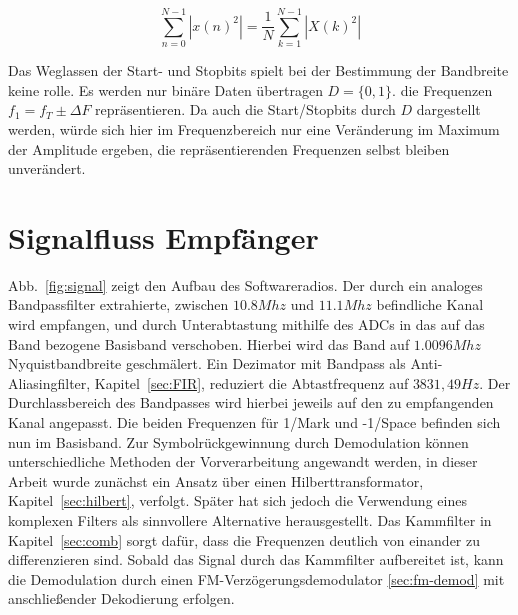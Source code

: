 \documentclass{article}
\begin{document}
$$
\sum_{n = 0}^{N - 1}\left\lvert x(n)^2\right\rvert =  \frac{1}{N} \sum_{k = 1}^{N-1}  \left\lvert X(k)^2\right\rvert 
$$

%
%
%
%
%

Das Weglassen der Start- und Stopbits spielt bei der Bestimmung der Bandbreite keine rolle.
Es werden nur binäre Daten übertragen $D = \{0, 1\}$. die Frequenzen $ f_1 = f_T \pm \varDelta F $ repräsentieren. 
Da auch die Start/Stopbits durch $D$ dargestellt werden, würde sich hier im Frequenzbereich
nur eine Veränderung im Maximum der Amplitude ergeben, die repräsentierenden Frequenzen selbst bleiben unverändert.



\section{Signalfluss Empfänger}

Abb.~\ref{fig:signal} zeigt den Aufbau des Softwareradios. Der durch ein analoges Bandpassfilter extrahierte, zwischen $10.8Mhz$ und $11.1Mhz$ befindliche Kanal wird empfangen, und durch Unterabtastung mithilfe des ADCs in das auf das Band bezogene Basisband verschoben.
Hierbei wird das Band auf $1.0096Mhz$ Nyquistbandbreite geschmälert. Ein Dezimator mit Bandpass als Anti-Aliasingfilter, Kapitel~\ref{sec:FIR}, reduziert die Abtastfrequenz auf $3831,49Hz$. Der Durchlassbereich des Bandpasses wird hierbei jeweils auf den zu empfangenden Kanal angepasst. Die beiden Frequenzen für 1/Mark und -1/Space befinden sich nun im Basisband. Zur Symbolrückgewinnung durch Demodulation können unterschiedliche Methoden der Vorverarbeitung angewandt werden, in dieser Arbeit wurde zunächst ein Ansatz über einen Hilberttransformator, Kapitel~\ref{sec:hilbert}, verfolgt. Später hat sich jedoch die Verwendung eines komplexen Filters
als sinnvollere Alternative herausgestellt. Das Kammfilter in Kapitel~\ref{sec:comb} sorgt dafür, dass die Frequenzen deutlich von einander zu differenzieren sind. Sobald das Signal durch das Kammfilter
aufbereitet ist, kann die Demodulation durch einen FM-Verzögerungsdemodulator \ref{sec:fm-demod} mit anschließender Dekodierung erfolgen.
\end{document}

